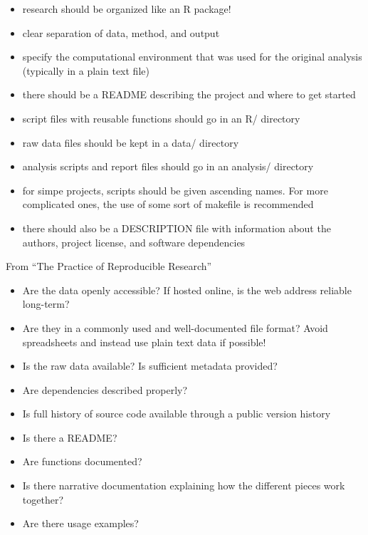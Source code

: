 \documentclass[12pt]{article}
\providecommand{\tightlist}{%
  \setlength{\itemsep}{0pt}\setlength{\parskip}{0pt}}
\begin{document}
\begin{itemize}
\tightlist
\item
  research should be organized like an R package!
\item
  clear separation of data, method, and output
\item
  specify the computational environment that was used for the original
  analysis (typically in a plain text file)
\item
  there should be a README describing the project and where to get
  started
\item
  script files with reusable functions should go in an R/ directory
\item
  raw data files should be kept in a data/ directory
\item
  analysis scripts and report files should go in an analysis/ directory
\item
  for simpe projects, scripts should be given ascending names. For more
  complicated ones, the use of some sort of makefile is recommended
\item
  there should also be a DESCRIPTION file with information about the
  authors, project license, and software dependencies
\end{itemize}

\citet{marwick2018packaging}

From ``The Practice of Reproducible Research''

\begin{itemize}
\item
  Are the data openly accessible? If hosted online, is the web address
  reliable long-term?
\item
  Are they in a commonly used and well-documented file format? Avoid
  spreadsheets and instead use plain text data if possible!
\item
  Is the raw data available? Is sufficient metadata provided?
\item
  Are dependencies described properly?
\item
  Is full history of source code available through a public version
  history
\item
  Is there a README?
\item
  Are functions documented?
\item
  Is there narrative documentation explaining how the different pieces
  work together?
\item
  Are there usage examples?
\end{itemize}
\end{document}
